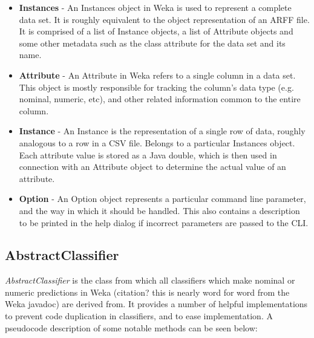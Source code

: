 \begin{itemize}
\item \textbf{Instances} - An Instances object in Weka is used to represent a complete data set. It is roughly equivalent to the object representation of an ARFF file. It is comprised of a list of Instance objects,  a list of Attribute objects and some other metadata such as the class attribute for the data set and its name.
\item \textbf{Attribute} - An Attribute in Weka refers to a single column in a data set. This object is mostly responsible for tracking the column's data type (e.g. nominal, numeric, etc), and other related information common to the entire column.
\item \textbf{Instance} - An Instance is the representation of a single row of data, roughly analogous to a row in a CSV file. Belongs to a particular Instances object. Each attribute value is stored as a Java double, which is then used in connection with an Attribute object to determine the actual value of an attribute.
\item \textbf{Option} - An Option object represents a particular command line parameter, and the way in which it should be handled. This also contains a description to be printed in the help dialog if incorrect parameters are passed to the CLI.
\end{itemize}

\subsection{AbstractClassifier}
\textit{AbstractClassifier} is the class from which all classifiers which make nominal or numeric predictions in Weka (citation? this is nearly word for word from the Weka javadoc) are derived from. It provides a number of helpful implementations to prevent code duplication in classifiers, and to ease implementation. A pseudocode description of some notable methods can be seen below:

